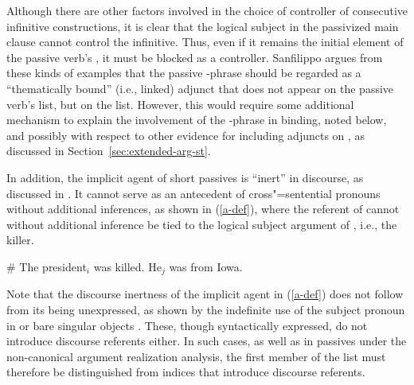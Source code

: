 \documentclass[output=paper
 	        ,biblatex
                ,babelshorthands
                ,newtxmath
                ,draftmode
                ,colorlinks, citecolor=brown
]{langscibook}
\begin{document}
Although there are other factors involved in the choice of controller of consecutive  infinitive constructions, it is clear that the logical subject in the passivized main clause cannot control the infinitive.
Thus, even if it remains the initial element of the passive verb's \argst, it must be blocked as a controller.
Sanfilippo argues from these kinds of examples that the passive -phrase should be regarded as a ``thematically bound'' (i.e., linked) adjunct that does
not appear on the passive verb's \argst list, but on the  list.
However, this would require some additional mechanism to explain the involvement of the -phrase in binding, noted below, and possibly with respect to other evidence for including adjuncts on \argst, as discussed in Section~\ref{sec:extended-arg-st}.

In addition, the implicit agent of short passives is ``inert'' in discourse, as discussed in \citet{KoenigandMauner1999}.
It cannot serve as an antecedent of cross"=sentential pronouns without additional inferences, as shown in (\ref{a-def}), where the referent of  cannot without additional inference be tied to the logical subject argument of , i.e., the killer.

\begin{exe}
\ex\label{a-def}
\# The president$_{i}$ was killed. He$_{j}$ was from Iowa.
\end{exe}

Note that the discourse inertness of the implicit agent in (\ref{a-def}) does not follow from its being unexpressed, as shown by the indefinite use of the subject pronoun  in  \citep[241--244]{Koenig1998c} or  bare singular objects \citep[89--108]{FarkasandDeSwart2003}.
These, though syntactically expressed, do not introduce discourse referents either.
In such cases, as well as in passives under the non-canonical argument realization analysis, the first member of the \argst list must therefore be distinguished from indices that introduce discourse referents.
\end{document}
